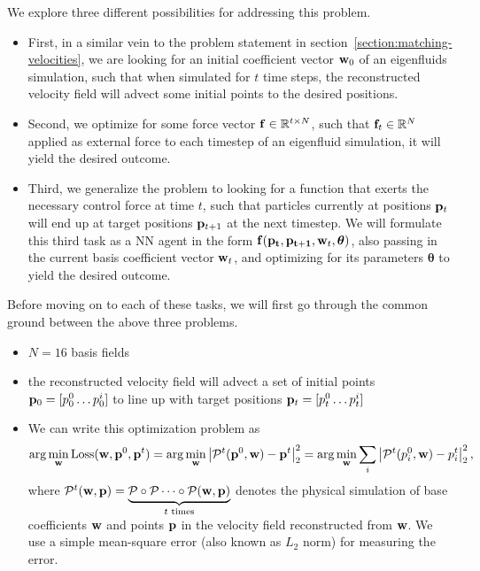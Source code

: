 We explore three different possibilities for addressing this problem. 
\begin{itemize}
  \item First, in a similar vein to the problem statement in
    section~\ref{section:matching-velocities}, we are looking for an initial
    coefficient vector $\vb{w}_0$ of an eigenfluids simulation, such that when
    simulated for $t$ time steps, the reconstructed velocity field will advect
    some initial points to the desired positions.
  \item Second, we optimize for some force vector $\vb{f}\in \mathbb{R}^{t\times
    N}$, such that $\vb{f}_t \in \mathbb{R}^N$ applied as external force to each
    timestep of an eigenfluid simulation, it will yield the desired outcome.
  \item Third, we generalize the problem to looking for a function that exerts
    the necessary control force at time $t$, such that particles currently at
    positions $\vb{p}_t$ will end up at target positions $\vb{p}_{t+1}$ at the
    next timestep. We will formulate this third task as a \acf{NN}
    agent in the form $\vb{f}(\vb{p_t}, \vb{p_{t+1}}, \vb{w}_{t},
    \boldsymbol\theta)$,
    also passing in the current basis coefficient vector $\vb{w}_t$, and
    optimizing for its parameters $\boldsymbol\theta$ to yield the desired outcome.
\end{itemize}

Before moving on to each of these tasks, we will first go through the common
ground between the above three problems.

\begin{itemize}
  \item $N=16$ basis fields
  \item the reconstructed velocity field will advect a set of initial points
$\vb{p}_0 = [p^0_0\dots p^i_0]$ to line up with target positions 
$\vb{p}_{t} = [p_t^0\dots p_t^i]$
  \item We can write this optimization problem as 
$$\arg\min_{\vb{w}} \text{Loss}(\vb{w}, \vb{p}^0, \vb{p}^t)
= \arg\min_{\vb{w}} \left| \mathcal{P}^{t}(\vb{p}^0, \vb{w})
- \vb{p}^t\right|_2^2 = \arg\min_{\vb{w}}
\sum_{i}\left|\mathcal{P}^{t}(p^0_i, \vb{w}) - p^t_i\right|_2^2, $$
where $\mathcal{P}^t(\vb{w}, \vb{p}) = \underbrace{\mathcal{P} \circ
\mathcal{P} \dots \circ \mathcal{P}(\vb{w}, \vb{p})}_{t \text{ times}}$
denotes the physical simulation of base coefficients $\vb{w}$ and 
points $\vb{p}$ in the velocity field reconstructed from $\vb{w}$. We
use a simple mean-square error (also known as $L_2$ norm) for measuring the error.
\end{itemize}

